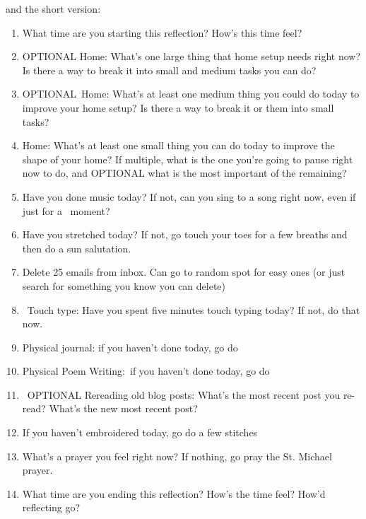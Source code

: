\documentclass[12pt]{article}
\renewcommand{\,}{\textsuperscript{,}}
\begin{document}
and the short version:

\begin{enumerate}

\item What time are you starting this reflection? How’s this time feel?

\item OPTIONAL Home: What’s one large thing that home setup needs right now? Is there a way to break it into small and medium tasks you can do?

\item OPTIONAL Home: What’s at least one medium thing you could do today to improve
your home setup? Is there a way to break it or them into small tasks?

\item Home: What’s at least one small thing you can do today to improve the
shape of your home? If multiple, what is the one you’re going to pause
right now to do, and OPTIONAL what is the most important of the remaining?

\item Have you done music today? If not, can you sing to a song right now, even if just for a  moment?

\item Have you stretched today? If not, go touch your toes for a few breaths and then do a sun salutation.

\item Delete 25 emails from inbox. Can go to random spot for easy ones (or just search for something you know you can delete)

\item Touch type: Have you spent five minutes touch typing today? If not, do that now.

\item Physical journal: if you haven't done today, go do

\item Physical Poem Writing: if you haven't done today, go do

\item OPTIONAL Rereading old blog posts: What’s the most recent post you re-read? What’s the new most recent post?

\item If you haven't embroidered today, go do a few stitches

\item What's a prayer you feel right now? If nothing, go pray the St. Michael prayer.

\item What time are you ending this reflection? How’s the time feel? How’d reflecting go?

\end{enumerate}
\end{document}
